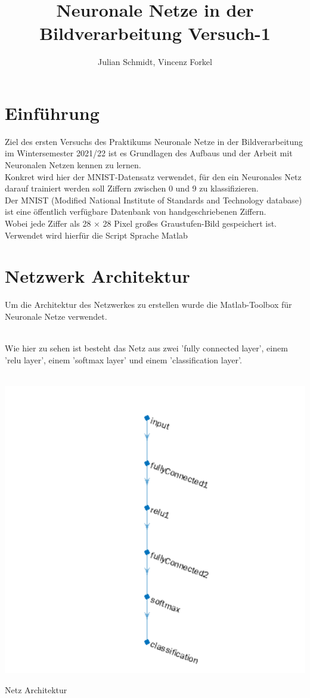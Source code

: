 \documentclass[8pt,a4paper]{article}
\title{Neuronale Netze in der Bildverarbeitung Versuch-1}
\author{Julian Schmidt, Vincenz Forkel}
\begin{document}
\maketitle
\newpage
\tableofcontents
\newpage
\section{Einführung}
Ziel des ersten Versuchs des Praktikums Neuronale Netze in der Bildverarbeitung im Wintersemester 2021/22 ist es Grundlagen des Aufbaus und der Arbeit mit Neuronalen Netzen kennen zu lernen.\\
Konkret wird hier der MNIST-Datensatz verwendet, für den ein Neuronales Netz darauf trainiert werden soll Ziffern zwischen 0 und 9 zu klassifizieren.\\

Der MNIST (Modified National Institute of Standards and Technology database) ist eine öffentlich verfügbare Datenbank von handgeschriebenen Ziffern.\\
Wobei jede Ziffer als 28 × 28 Pixel großes Graustufen-Bild gespeichert ist.\\

Verwendet wird hierfür die Script Sprache Matlab
\newpage
\section{Netzwerk Architektur}\label{architektur}
Um die Architektur des Netzwerkes zu erstellen wurde die Matlab-Toolbox für Neuronale Netze verwendet.


\\
Wie hier zu sehen ist besteht das Netz aus zwei 'fully connected layer', einem 'relu layer', einem 'softmax layer' und einem 'classification layer'.
\\
\\

\begin{center}
    

    \includegraphics[scale = 0.4]{model.png}
    \caption{Netz Architektur}
\end{center}
\end{document}
